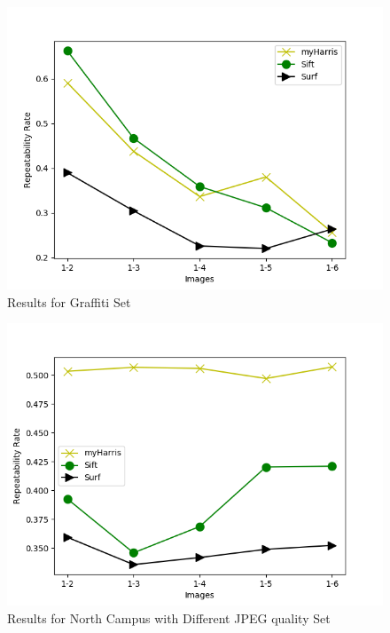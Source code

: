 \documentclass[12pt]{article}
\begin{document}
\begin{figure}[H]
    \centering
    \includegraphics{images/repeatabilities-graffiti.png}
    \caption{Results for Graffiti Set}
    \label{graffiti}
\end{figure}
\begin{figure}[H]
    \centering
    \includegraphics{images/repeatabilities-jpeg.png}
    \caption{Results for North Campus with Different JPEG quality Set}
\end{figure}
\end{document}
